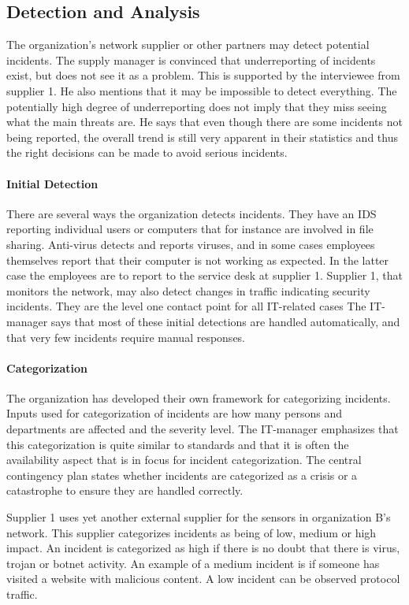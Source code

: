 \subsection{Detection and Analysis}
The organization's network supplier or other partners may detect potential incidents. The supply manager is convinced that underreporting of incidents exist, but does not see it as a problem. This is supported by the interviewee from supplier 1. He also mentions that it may be impossible to detect everything. The potentially high degree of underreporting does not imply that they miss seeing what the main threats are. He says that even though there are some incidents not being reported, the overall trend is still very apparent in their statistics and thus the right decisions can be made to avoid serious incidents. 

\paragraph{Initial Detection}
There are several ways the organization detects incidents. They have an \ac{IDS} reporting individual users or computers that for instance are involved in file sharing. Anti-virus detects and reports viruses, and in some cases employees themselves report that their computer is not working as expected. In the latter case the employees are to report to the service desk at supplier 1. Supplier 1, that monitors the network, may also detect changes in traffic indicating security incidents. They are the level one contact point for all IT-related cases The IT-manager says that most of these initial detections are handled automatically, and that very few incidents require manual responses. 

\paragraph{Categorization}
The organization has developed their own framework for categorizing incidents. Inputs used for categorization of incidents are how many persons and departments are affected and the severity level. The IT-manager emphasizes that this categorization is quite similar to standards and that it is often the availability aspect that is in focus for incident categorization. The central contingency plan states whether incidents are categorized as a crisis or a catastrophe to ensure they are handled correctly.

Supplier 1 uses yet another external supplier for the sensors in organization B's network. This supplier categorizes incidents as being of low, medium or high impact. An incident is categorized as high if there is no doubt that there is virus, trojan or botnet activity. An example of a medium incident is if someone has visited a website with malicious content. A low incident can be observed protocol traffic.

